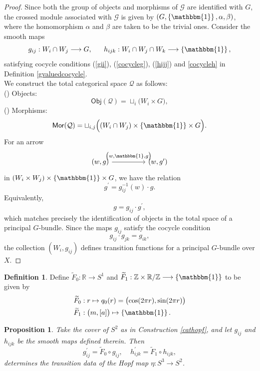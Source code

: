\documentclass{article}
\theoremstyle{plain}
\newtheorem{prop}[thm]{Proposition}
\theoremstyle{definition}
\newtheorem{defn}[thm]{Definition}
\newcommand{\rNum}[1]{\lowercase\expandafter{\romannumeral #1\relax}}
\begin{document}
\begin{proof}
Since both the group of objects and morphisms of $\mathcal{G}$ are identified with $G$, the crossed module associated with $\mathcal{G}$ is given by $(G,\left\{\mathbbm{1}\right\},\alpha,\beta)$, where the homomorphism $\alpha$ and $\beta$ are taken to be the trivial ones. Consider the smooth maps
\[
g_{ij}:W_i \cap W_j \longrightarrow G, ~~~~~
h_{ijk}:W_i \cap W_j \cap W_k \longrightarrow \left\{\mathbbm{1}\right\},
\]
satisfying cocycle conditions (\ref{gii}), (\ref{cocycleg}),  (\ref{hijj}) and \ref{cocycleh} in Definition \ref{gvaluedcocycle}. \\
We construct the total categorical space $\mathcal{Q}$ as follows: \\
(\rNum{1}) Objects:
\[
\mathsf{Obj}(\mathcal{Q}) = \sqcup_{i} \bigl(W_i \times G\bigr),
\]
(\rNum{2}) Morphisms:
\[
\mathsf{Mor}(\mathcal{Q}) = \sqcup_{i,j} \Bigl((W_i \cap W_j) \times \left\{\mathbbm{1}\right\} \times G\Bigr).
\]
For an arrow
\[
\begin{tikzcd}
(w,g) \arrow[rr,"{\bigl(w,\mathbbm{1},g\bigr)}"] & & (w,g^\prime)
\end{tikzcd}
\]
in $(W_i \times W_j) \times \left\{\mathbbm{1}\right\} \times G$, we have the relation $$g^\prime = g^{-1}_{ij}(w) \cdot g.$$
Equivalently, $$g = g_{ij} \cdot g^\prime,$$
which matches precisely the identification of objects in the total space of a principal $G$-bundle. Since the maps $g_{ij}$ satisfy the cocycle condition
\[
g_{ij} \cdot g_{jk} = g_{ik},
\]
the collection $(W_i,g_{ij})$ defines transition functions for a principal $G$-bundle over $X$.
\end{proof}
\begin{defn}\label{curlcirtocir}
Define $\widetilde{F}_0:\mathbb{R} \longrightarrow S^1$ and $\widetilde{F}_1:\mathbb{Z} \times \mathbb{R}/\mathbb{Z} \longrightarrow \left\{\mathbbm{1}\right\}$ to be given by
\begin{align*}
\widetilde{F}_0 & : r \mapsto q_0(r) = \bigl(\cos(2\pi r),\sin(2\pi r)\bigr) \\
\widetilde{F}_1 & : \bigl(m,[a]\bigr) \mapsto \left\{\mathbbm{1}\right\}.
\end{align*}
\end{defn}
\begin{prop}\label{giveHopf}
Take the cover of $S^2$ as in Construction \ref{cathopf}, and let $g_{ij}$ and $h_{ijk}$ be the smooth maps defined therein. Then $$g^\prime_{ij} = \widetilde{F}_0 \circ g_{ij}, ~~~~~  h^\prime_{ijk} = \widetilde{F}_1 \circ h_{ijk},$$
determines the transition data of the Hopf map $\eta:S^3 \longrightarrow S^2$.
\end{prop}
\end{document}

